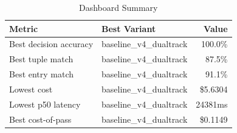 \begin{table}[htbp]
\centering
\caption{Dashboard Summary}
\label{tab:summary}
\begin{tabular}{l l r}
\toprule
Metric & Best Variant & Value \\
\midrule
  Best decision accuracy & baseline\_v4\_dualtrack & 100.0\% \\
  Best tuple match & baseline\_v4\_dualtrack & 87.5\% \\
  Best entry match & baseline\_v4\_dualtrack & 91.1\% \\
  Lowest cost & baseline\_v4\_dualtrack & \$5.6304 \\
  Lowest p50 latency & baseline\_v4\_dualtrack & 24381ms \\
  Best cost-of-pass & baseline\_v4\_dualtrack & \$0.1149 \\
\bottomrule
\end{tabular}
\end{table}
